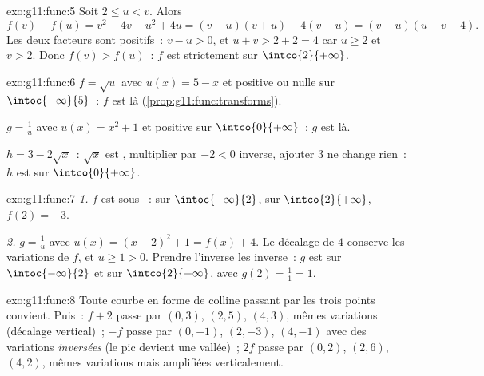 \begin{solution}{exo:g11:func:5}
Soit $2 \leq u < v$. Alors
\[
f(v) - f(u) = v^2 - 4v - u^2 + 4u = (v-u)(v+u) - 4(v-u)
= (v - u)(u + v - 4).
\]
Les deux facteurs sont positifs~: $v - u > 0$, et $u + v > 2 + 2 = 4$
car $u \geq 2$ et $v > 2$. Donc $f(v) > f(u)$~: $f$ est strictement
 sur $\intco{2}{+\infty}$.
\end{solution}

\begin{solution}{exo:g11:func:6}
$f = \sqrt{u}$ avec $u(x) = 5 - x$  et positive ou nulle sur
$\intoc{-\infty}{5}$~: $f$ est  là
(\cref{prop:g11:func:transforms}).

$g = \frac1u$ avec $u(x) = x^2 + 1$  et positive sur
$\intco{0}{+\infty}$~: $g$ est  là.

$h = 3 - 2\sqrt x$~: $\sqrt x$ est , multiplier par $-2 < 0$
inverse, ajouter $3$ ne change rien~: $h$ est  sur
$\intco{0}{+\infty}$.
\end{solution}

\begin{solution}{exo:g11:func:7}
\emph{1.} $f$ est sous ~:  sur
$\intoc{-\infty}{2}$,  sur $\intco{2}{+\infty}$, 
$f(2) = -3$.

\emph{2.} $g = \frac{1}{u}$ avec $u(x) = (x-2)^2 + 1 = f(x) + 4$. Le
décalage de $4$ conserve les variations de $f$, et $u \geq 1 > 0$.
Prendre l'inverse les inverse~: $g$ est  sur
$\intoc{-\infty}{2}$ et  sur $\intco{2}{+\infty}$, avec
 $g(2) = \frac{1}{1} = 1$.
\end{solution}

\begin{solution}{exo:g11:func:8}
Toute courbe en forme de colline passant par les trois points convient.
Puis~: $f + 2$ passe par $(0,3)$, $(2,5)$, $(4,3)$, mêmes variations
(décalage vertical)~; $-f$ passe par $(0,-1)$, $(2,-3)$, $(4,-1)$ avec
des variations \emph{inversées} (le pic devient une vallée)~; $2f$
passe par $(0,2)$, $(2,6)$, $(4,2)$, mêmes variations mais amplifiées
verticalement.
\end{solution}


